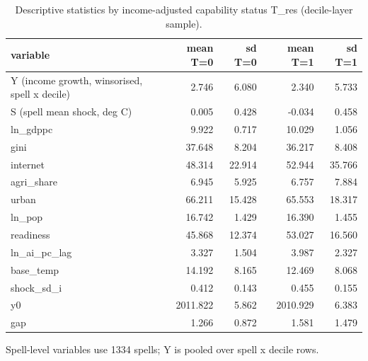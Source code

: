 \begin{table}[htbp]
\centering
\caption{Descriptive statistics by income-adjusted capability status T\_res (decile-layer sample).}
\label{tab:desc}
\begin{tabular}{lrrrr}
\toprule
variable & mean T=0 & sd T=0 & mean T=1 & sd T=1 \\
\midrule
Y (income growth, winsorised, spell x decile) & 2.746 & 6.080 & 2.340 & 5.733 \\
S (spell mean shock, deg C) & 0.005 & 0.428 & -0.034 & 0.458 \\
ln\_gdppc & 9.922 & 0.717 & 10.029 & 1.056 \\
gini & 37.648 & 8.204 & 36.217 & 8.408 \\
internet & 48.314 & 22.914 & 52.944 & 35.766 \\
agri\_share & 6.945 & 5.925 & 6.757 & 7.884 \\
urban & 66.211 & 15.428 & 65.553 & 18.317 \\
ln\_pop & 16.742 & 1.429 & 16.390 & 1.455 \\
readiness & 45.868 & 12.374 & 53.027 & 16.560 \\
ln\_ai\_pc\_lag & 3.327 & 1.504 & 3.987 & 2.327 \\
base\_temp & 14.192 & 8.165 & 12.469 & 8.068 \\
shock\_sd\_i & 0.412 & 0.143 & 0.455 & 0.155 \\
y0 & 2011.822 & 5.862 & 2010.929 & 6.383 \\
gap & 1.266 & 0.872 & 1.581 & 1.479 \\
\bottomrule
\end{tabular}
\par\smallskip\footnotesize Spell-level variables use 1334 spells; Y is pooled over spell x decile rows.
\end{table}
